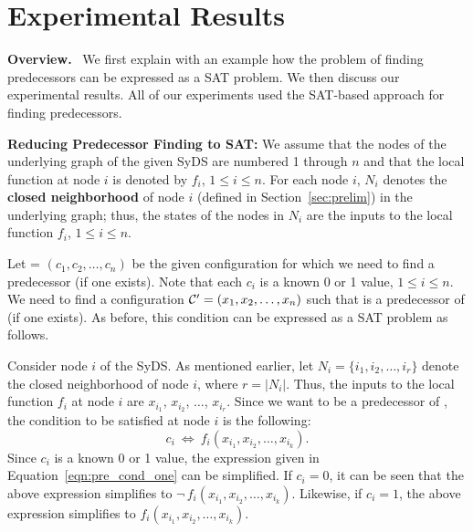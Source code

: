 \section{Experimental Results}
\label{sec:experiments}

\noindent
\textbf{Overview.}~ We first explain with an example how the 
problem of finding 
predecessors can be expressed as a SAT problem.
We then discuss our experimental results.
All of our experiments used the SAT-based approach for finding
predecessors.

\smallskip

\noindent
\textbf{Reducing Predecessor Finding to SAT:}
We assume that the nodes of the underlying graph of the
given SyDS are numbered 1 through $n$ and that
the local function at node $i$ is denoted by $f_i$,
$1 \leq i \leq n$.
For each node $i$, $N_i$ denotes the \textbf{closed neighborhood}
of node $i$ (defined in Section~\ref{sec:prelim})
in the underlying graph; thus, the states of the nodes in $N_i$ 
are the inputs to the local function $f_i$,
$1 \leq i \leq n$.

Let \calc{} = $(c_1, c_2, \ldots, c_n)$ be
the given configuration for which we need to 
find a predecessor (if one exists).
Note that each $c_i$ is a known 0 or 1 value, $1 \leq i \leq n$.
We need to find a configuration 
$\mbox{$\mathcal{C'}$}{} = (x_1, x_2, \ldots, x_n)$ such that \calcp{}
is a predecessor of \calc{} (if one exists). 
As before, this condition can be expressed as a SAT problem as follows.

Consider node $i$ of the SyDS. 
As mentioned earlier, let $N_i = \{i_1, i_2, \ldots, i_r\}$
denote the closed neighborhood of node $i$, where $r = |N_i|$.
Thus, the inputs to the local function $f_i$ at node $i$
are $x_{i_1}$, $x_{i_2}$, $\ldots$,  $x_{i_r}$.
Since we want \calcp{} to be a predecessor of \calc, the condition to
be satisfied at node $i$ is the following:
\begin{equation}\label{eqn:pre_cond_one}
     c_i  ~\Leftrightarrow~ f_i(x_{i_1}, x_{i_2}, \ldots,  x_{i_k}).
\end{equation}
Since $c_i$ is a known 0 or 1 value, the expression given 
in Equation~\eqref{eqn:pre_cond_one} can be simplified.
If $c_i = 0$, it can be seen that the above expression 
simplifies to $\neg\,f_i(x_{i_1}, x_{i_2}, \ldots,  x_{i_k})$.
Likewise, if $c_i = 1$, the above expression 
simplifies to $f_i(x_{i_1}, x_{i_2}, \ldots,  x_{i_k})$.

